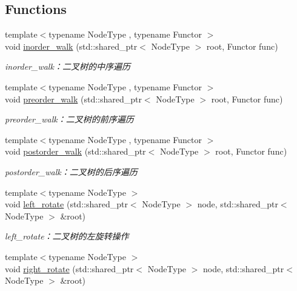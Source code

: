 \subsection*{Functions}
\begin{DoxyCompactItemize}
\item 
{\footnotesize template$<$typename Node\+Type , typename Functor $>$ }\\void \hyperlink{namespace_introdunction_to_algorithm_1_1_tree_algorithm_a2d05eb07edf5780ad3495f7c38039e4f}{inorder\+\_\+walk} (std\+::shared\+\_\+ptr$<$ Node\+Type $>$ root, Functor func)
\begin{DoxyCompactList}\small\item\em inorder\+\_\+walk：二叉树的中序遍历 \end{DoxyCompactList}\item 
{\footnotesize template$<$typename Node\+Type , typename Functor $>$ }\\void \hyperlink{namespace_introdunction_to_algorithm_1_1_tree_algorithm_abd47576f0c155a7de7c0553ad431b192}{preorder\+\_\+walk} (std\+::shared\+\_\+ptr$<$ Node\+Type $>$ root, Functor func)
\begin{DoxyCompactList}\small\item\em preorder\+\_\+walk：二叉树的前序遍历 \end{DoxyCompactList}\item 
{\footnotesize template$<$typename Node\+Type , typename Functor $>$ }\\void \hyperlink{namespace_introdunction_to_algorithm_1_1_tree_algorithm_aed5eccc83270b880c05500c952834daa}{postorder\+\_\+walk} (std\+::shared\+\_\+ptr$<$ Node\+Type $>$ root, Functor func)
\begin{DoxyCompactList}\small\item\em postorder\+\_\+walk：二叉树的后序遍历 \end{DoxyCompactList}\item 
{\footnotesize template$<$typename Node\+Type $>$ }\\void \hyperlink{namespace_introdunction_to_algorithm_1_1_tree_algorithm_a698a67d6e06ceae1fec22fed6be32fdc}{left\+\_\+rotate} (std\+::shared\+\_\+ptr$<$ Node\+Type $>$ node, std\+::shared\+\_\+ptr$<$ Node\+Type $>$ \&root)
\begin{DoxyCompactList}\small\item\em left\+\_\+rotate：二叉树的左旋转操作 \end{DoxyCompactList}\item 
{\footnotesize template$<$typename Node\+Type $>$ }\\void \hyperlink{namespace_introdunction_to_algorithm_1_1_tree_algorithm_abecfb8158fb1959def0d0c188b46959c}{right\+\_\+rotate} (std\+::shared\+\_\+ptr$<$ Node\+Type $>$ node, std\+::shared\+\_\+ptr$<$ Node\+Type $>$ \&root)

\end{DoxyCompactItemize}
